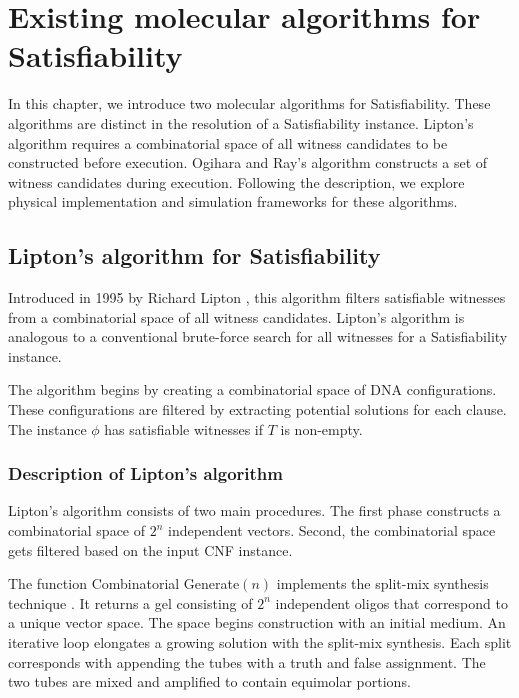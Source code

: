 \chapter{Existing molecular algorithms for {\sc Satisfiability}}


In this chapter, we introduce two molecular algorithms for {\sc Satisfiability}.  These algorithms are distinct in the resolution of a {\sc Satisfiability} instance.  Lipton's algorithm requires a combinatorial space of all witness candidates to be constructed before execution.  Ogihara and Ray's algorithm constructs a set of witness candidates during execution.  Following the description, we explore physical implementation and simulation frameworks for these algorithms.
\section{Lipton's algorithm for {\sc Satisfiability}}


Introduced in 1995 by Richard Lipton \cite{Lipton95usingdna}, this algorithm filters satisfiable witnesses from a combinatorial space of all witness candidates.  Lipton's algorithm is analogous to a conventional brute-force search for all witnesses for a {\sc Satisfiability} instance.

The algorithm begins by creating a combinatorial space of DNA configurations.  These configurations are filtered by extracting potential solutions for each clause.  The instance $\phi$ has satisfiable witnesses if $T$ is non-empty.

	\subsection{Description of Lipton's algorithm}
		
Lipton's algorithm consists of two main procedures.  The first phase constructs a combinatorial space of $2^n$ independent vectors.  Second, the combinatorial space gets filtered based on the input CNF instance. 		

The function {\sc Combinatorial Generate}$(n)$ implements the split-mix synthesis technique \cite{furka1982, furkaBook}.  It returns a gel consisting of $2^n$ independent oligos that correspond to a unique vector space.  The space begins construction with an initial medium.  An iterative loop elongates a growing solution with the split-mix synthesis.  Each split corresponds with appending the tubes with a truth and false assignment.  The two tubes are mixed and amplified to contain equimolar portions.  

